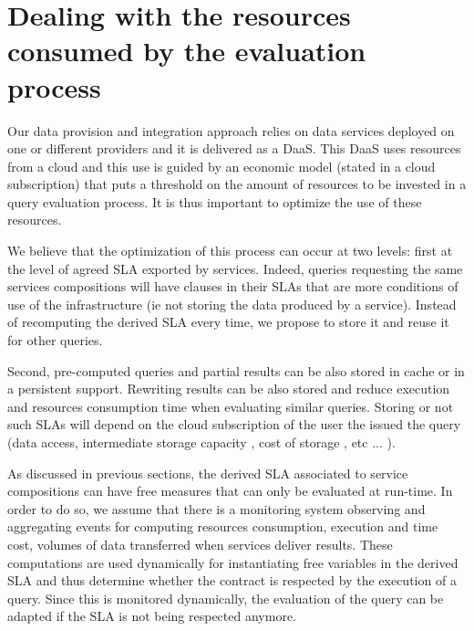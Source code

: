  
\section{Dealing with the resources consumed by the evaluation process}
\label{sec:queryProcessOpt}
 Our data provision and integration approach relies on data services deployed on one or different providers and it is delivered as a DaaS. This DaaS  uses resources from a cloud and this use  is  guided by an economic model (stated in a cloud subscription) that puts a threshold on the amount of resources to be invested in a query evaluation process. It is thus important to optimize the use of these resources.
 
 We believe that the optimization of this process can occur at two levels: first at the level of agreed SLA exported by services.  Indeed, queries requesting the same services compositions will have clauses in their SLAs that are more conditions of use of the infrastructure (ie not storing the data produced by a service). Instead of recomputing the derived SLA every time, we propose to store it and reuse it for other queries. 
 
Second, pre-computed queries and partial results can be also stored in cache or in a persistent support. Rewriting results can be also stored and reduce execution and resources consumption time when evaluating similar queries. Storing or not such SLAs will depend on the cloud subscription of the user the issued the query (data access, intermediate storage capacity , cost of storage , etc ... ).

As discussed in previous sections, the derived SLA associated to service compositions can have free measures that can only be evaluated at run-time. In order to do so, we assume that there is a monitoring system observing and aggregating events for computing resources consumption, execution and time cost, volumes of data transferred when services deliver results. These computations are used dynamically for instantiating free variables in the derived SLA and thus determine whether the contract is respected by the execution of a query. Since this is monitored dynamically, the evaluation of the query can be adapted if the SLA is not being respected anymore.

